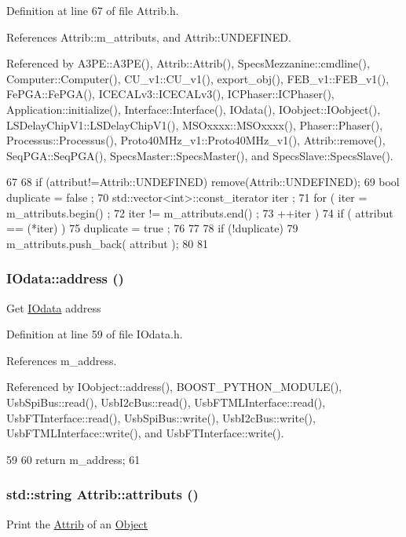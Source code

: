 Definition at line 67 of file Attrib.h.

References Attrib::m\_\-attributs, and Attrib::UNDEFINED.

Referenced by A3PE::A3PE(), Attrib::Attrib(), SpecsMezzanine::cmdline(), Computer::Computer(), CU\_\-v1::CU\_\-v1(), export\_\-obj(), FEB\_\-v1::FEB\_\-v1(), FePGA::FePGA(), ICECALv3::ICECALv3(), ICPhaser::ICPhaser(), Application::initialize(), Interface::Interface(), IOdata(), IOobject::IOobject(), LSDelayChipV1::LSDelayChipV1(), MSOxxxx::MSOxxxx(), Phaser::Phaser(), Processus::Processus(), Proto40MHz\_\-v1::Proto40MHz\_\-v1(), Attrib::remove(), SeqPGA::SeqPGA(), SpecsMaster::SpecsMaster(), and SpecsSlave::SpecsSlave().


\begin{DoxyCode}
67                             {
68     if (attribut!=Attrib::UNDEFINED) remove(Attrib::UNDEFINED);
69     bool duplicate = false ;
70     std::vector<int>::const_iterator iter ;
71     for ( iter  = m_attributs.begin() ;
72           iter != m_attributs.end()   ;
73           ++iter ) {
74       if ( attribut == (*iter) ) {
75         duplicate = true ;
76       }
77     }
78     if (!duplicate) {
79       m_attributs.push_back( attribut );
80     }
81   }
\end{DoxyCode}
\hypertarget{classIOdata_afe410c86881b8c2082a08e5ce9843306}{
\subsubsection[{address}]{ IOdata::address ()}}
\label{classIOdata_afe410c86881b8c2082a08e5ce9843306}
Get \hyperlink{classIOdata}{IOdata} address 

Definition at line 59 of file IOdata.h.

References m\_\-address.

Referenced by IOobject::address(), BOOST\_\-PYTHON\_\-MODULE(), UsbSpiBus::read(), UsbI2cBus::read(), UsbFTMLInterface::read(), UsbFTInterface::read(), UsbSpiBus::write(), UsbI2cBus::write(), UsbFTMLInterface::write(), and UsbFTInterface::write().


\begin{DoxyCode}
59                {
60     return m_address;
61   }
\end{DoxyCode}
\hypertarget{classAttrib_aee7bbf16b144887f196e1341b24f8a26}{
\subsubsection[{attributs}]{\setlength{\rightskip}{0pt plus 5cm}std::string Attrib::attributs ()}}
\label{classAttrib_aee7bbf16b144887f196e1341b24f8a26}
Print the \hyperlink{classAttrib}{Attrib} of an \hyperlink{classObject}{Object} 

